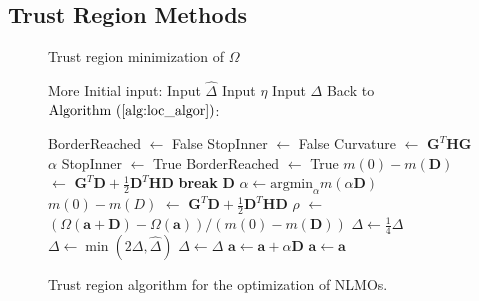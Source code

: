 \documentclass[aps,prl,reprint,amsmath,amssymb]{revtex4-1}
\begin{document}
\subsection{Trust Region Methods}

\begin{figure}
\begin{algorithm}[H]
  \caption{Trust region minimization of $\Omega$}
  \label{alg:tr}
   \begin{algorithmic}[1]
   	\State More Initial input: 
	\State Input $\hat{\Delta}$ 
	\State Input $\eta$  
	\State Input $\Delta$ 
	\State Back to$\text{Algorithm~(\ref{alg:loc_algor})}$:

                 \State BorderReached $\gets$ False 
                 \State StopInner $\gets$ False 
                 \Repeat {}
                    \State Curvature $\gets$  $\mathbf{G}^{T}\mathbf{H}\mathbf{G}$
                       \State $\alpha$ 
                       \State StopInner $\gets$ True
                       \State BorderReached $\gets$ True
                       \State  $m(0)-m(\mathbf{D})$ $\gets$  $\mathbf{G}^{T}\mathbf{D}+\frac{1}{2}\mathbf{D}^{T}\mathbf{H}\mathbf{D}$
                       \State \textbf{break}
                    \Else
                       \State $\mathbf{D}$ 
                       \State $\alpha \gets \text{argmin}_{\alpha} m(\alpha \mathbf{D})$ 
                       \State  $m(0)-m(D)$ $\gets$  $\mathbf{G}^{T}\mathbf{D}+\frac{1}{2}\mathbf{D}^{T}\mathbf{H}\mathbf{D}$
                    \EndIf
                 \State $\rho$ $\gets$ $(\Omega(\mathbf{a}+\mathbf{D})-\Omega(\mathbf{a})) / (m(0)-m(\mathbf{D}))$
                    \State $\Delta \gets \frac{1}{4}\Delta$
                 \Else
                       \State $\Delta \gets \min{(2\Delta, \hat{\Delta})}$
                     \Else
                        \State $\Delta \gets \Delta$ 
                     \EndIf
                 \EndIf
                 \If{$\rho > \eta$}
                    \State $\mathbf{a}\gets \mathbf{a} + \alpha \mathbf{D}$ 
                  \Else
                     \State $\mathbf{a}\gets  \mathbf{a}$ 
                 \EndIf
   \end{algorithmic}
\end{algorithm}
\caption{\label{fig:tr} Trust region algorithm for the optimization of NLMOs.}
\end{figure}
\end{document}
